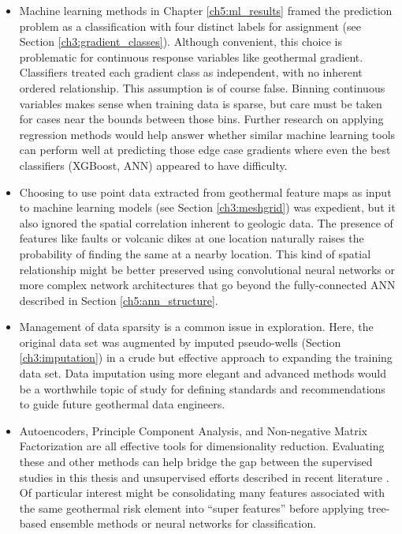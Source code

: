 \begin{itemize}
    \item Machine learning methods in Chapter \ref{ch5:ml_results} framed the prediction problem as a classification with four distinct labels for assignment (see Section \ref{ch3:gradient_classes}). Although convenient, this choice is problematic for continuous response variables like geothermal gradient. Classifiers treated each gradient class as independent, with no inherent ordered relationship. This assumption is of course false. Binning continuous variables makes sense when training data is sparse, but care must be taken for cases near the bounds between those bins. Further research on applying regression methods would help answer whether similar machine learning tools can perform well at predicting those edge case gradients where even the best classifiers (XGBoost, ANN) appeared to have difficulty.
    \item Choosing to use point data extracted from geothermal feature maps as input to machine learning models (see Section \ref{ch3:meshgrid}) was expedient, but it also ignored the spatial correlation inherent to geologic data. The presence of features like faults or volcanic dikes at one location naturally raises the probability of finding the same at a nearby location. This kind of spatial relationship might be better preserved using convolutional neural networks or more complex network architectures that go beyond the fully-connected ANN described in Section \ref{ch5:ann_structure}.
    \item Management of data sparsity is a common issue in exploration. Here, the original data set was augmented by imputed pseudo-wells (Section \ref{ch3:imputation}) in a crude but effective approach to expanding the training data set. Data imputation using more elegant and advanced methods would be a worthwhile topic of study for defining standards and recommendations to guide future geothermal data engineers.
    \item Autoencoders, Principle Component Analysis, and Non-negative Matrix Factorization are all effective tools for dimensionality reduction. Evaluating these and other methods can help bridge the gap between the supervised studies in this thesis and unsupervised efforts described in recent literature \citep{pepin_new_2019,smith_characterizing_2021,vesselinov_discovering_2020}. Of particular interest might be consolidating many features associated with the same geothermal risk element into “super features” before applying tree-based ensemble methods or neural networks for classification.

\end{itemize}
